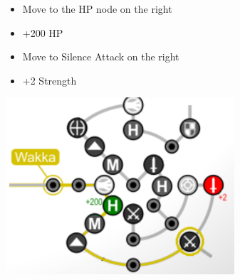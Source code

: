 \begin{multicols}{2}
\begin{spheregrid}
\begin{itemize}
\begin{itemize}
		\item Move to the HP node on the right
		\item +200 HP
		\item Move to Silence Attack on the right
		\item +2 Strength
	\end{itemize}
	\includegraphics{graphics/wakkammr}
	\end{itemize}
\end{spheregrid}


\end{multicols}
